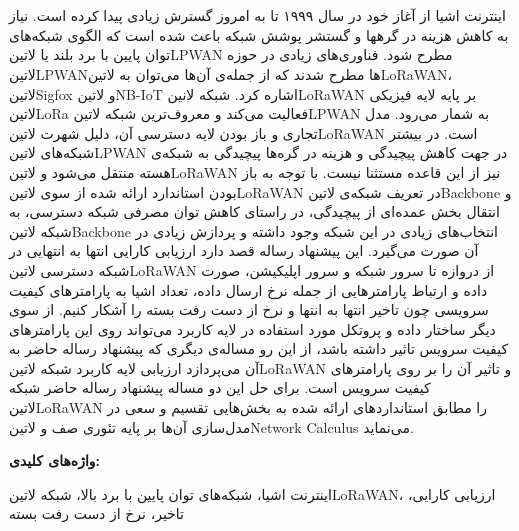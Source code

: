 \newpage\clearpage

\pagestyle{abstract}

\vspace*{-1cm}
\section*{\centering \abstractname}
\vspace*{.5cm}

اینترنت اشیا از آغاز خود در سال ۱۹۹۹ تا به امروز گسترش زیادی پیدا کرده است.
نیاز به کاهش هزینه در گرهها و گستشر پوشش شبکه باعث شده است که الگوی
شبکه‌های توان پایین با برد بلند یا
‌لاتین{LPWAN} مطرح شود.
فناوری‌های زیادی در حوزه ‌لاتین{LPWAN}ها مطرح شدند که از جمله‌ی آن‌ها می‌توان به ‌لاتین{LoRaWAN}، ‌لاتین{Sigfox} و ‌لاتین{NB-IoT}
اشاره کرد. شبکه ‌لانین{LoRaWAN} بر پایه لایه فیزیکی ‌لاتین{LoRa} فعالیت می‌کند و
معروف‌ترین شبکه ‌لاتین{LPWAN} به شمار می‌رود. مدل تجاری و باز بودن
لایه دسترسی آن، دلیل شهرت ‌لاتین{LoRaWAN} است.
در بیشتر شبکه‌های ‌لاتین{LPWAN} در جهت کاهش پیچیدگی و هزینه در گره‌ها پیچیدگی به شبکه‌ی هسته منتقل می‌شود و ‌لاتین{LoRaWAN}
نیز از این قاعده مستثنا نیست.
با توجه به باز بودن استاندارد ارائه شده از سوی ‌لاتین{LoRaWAN} در تعریف شبکه‌ی ‌لاتین{Backbone} و
انتقال بخش عمده‌ای از پیچیدگی، در راستای کاهش توان مصرفی
شبکه دسترسی، به شبکه ‌لاتین{Backbone} انتخاب‌های زیادی در این شبکه وجود داشته و پردازش زیادی در آن صورت می‌گیرد.
این پیشنهاد رساله قصد دارد ارزیابی کارایی انتها به انتهایی در شبکه دسترسی ‌لاتین{LoRaWAN}
از دروازه تا سرور شبکه و سرور اپلیکیشن،
صورت داده و ارتباط پارامترهایی از جمله نرخ ارسال داده، تعداد اشیا
به پارامترهای کیفیت سرویسی چون تاخیر انتها به انتها و نرخ از دست رفت بسته را آشکار کنیم.
از سوی دیگر ساختار داده و پروتکل مورد استفاده در لایه کاربرد می‌تواند روی این پارامترهای کیفیت سرویس تاثیر داشته باشد،
از این رو مساله‌ی دیگری که پیشنهاد رساله حاضر به آن می‌پردازد
ارزیابی لایه کاربرد شبکه ‌لاتین{LoRaWAN}
و تاثیر آن را بر روی پارامترهای کیفیت سرویس است.
برای حل این دو مساله پیشنهاد رساله حاضر شبکه ‌لاتین{LoRaWAN} را
مطابق استانداردهای ارائه شده
به بخش‌هایی تقسیم و سعی در مدل‌سازی آن‌ها بر پایه تئوری صف و ‌لاتین{Network Calculus}
می‌نماید.

\vspace*{2cm}

{%
  \noindent\large\textbf{واژه‌های کلیدی:}
}\par
\vspace*{.5cm}
اینترنت اشیا، شبکه‌های توان پایین با برد بالا، شبکه ‌لاتین{LoRaWAN}، ارزیابی کارایی، تاخیر، نرخ از دست رفت بسته
